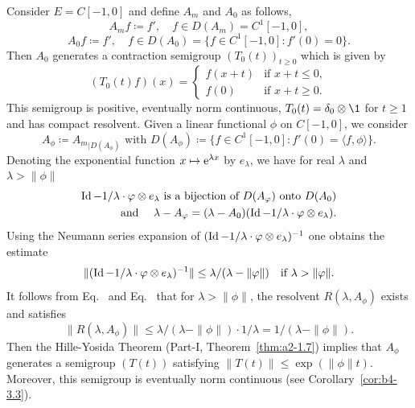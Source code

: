 \begin{example}
\begin{enumerate}[\upshape (i), wide, labelindent=.25em]
	Consider $E = C[-1,0]$ and define $A_{m}$ and $A_{0}$ as follows,
	\begin{equation}\label{eq:b3-2.23}
		A_{m}f \coloneq f', \quad f \in D(A_{m}) = C^{1}[-1,0] , 
	\end{equation}
	\begin{equation}\label{eq:b3-2.24}
		A_{0}f \coloneq f', \quad f \in D(A_{0}) = \{f \in C^{1}[-1,0] \colon f'(0) = 0\}.
	\end{equation}
	Then $A_{0}$ generates a contraction semigroup $(T_{0}(t))_{t \geq 0}$ which is given by
	\begin{equation}\label{eq:b3-2.25}
		(T_{0}(t)f)(x) = \begin{cases}
			f(x+t) & \text{if } x+t \leq 0 ,  \\
			f(0) & \text{if } x+t \geq 0.
		\end{cases}
	\end{equation}
	This semigroup is positive, eventually norm continuous, $T_{0}(t) = \delta_{0}\otimes \1$ for $t \geq 1$ and has compact resolvent.
	Given a linear functional $\phi$ on $C[-1,0]$, we consider
	\begin{equation}\label{eq:b3-2.26}
		A_{\phi} \coloneq {A_{m}}_{|D(A_{\phi})} \text{ with } D(A_{\phi}) \coloneq \{f \in C^{1}[-1,0] \colon f'(0) = \langle f,\phi \rangle\}.
	\end{equation}
	Denoting the exponential function $x \mapsto \mathrm{e}^{\lambda x}$ by $e_{\lambda}$, we have for real $\lambda$ and $\lambda > \|\phi\|$
	 \begin{equation}\label{eq:b3-2.27}
	 \begin{aligned}
		\Id  - 1/\lambda \cdot \phi \otimes e_{\lambda} \text{ is a bijection of } D(A_{\phi}) \text{ onto } D(A_{0})   \\
		\text{ and }\quad \lambda - A_{\phi} = (\lambda - A_{0})(\Id  - 1/\lambda \cdot \phi \otimes e_{\lambda}).
	\end{aligned}
	\end{equation}
	Using the Neumann series expansion of\/ $(\Id  - 1/\lambda \cdot \phi \otimes e_{\lambda})^{-1}$ one obtains the estimate
	\begin{equation}\label{eq:b3-2.28}
		\|(\Id  - 1/\lambda \cdot \phi \otimes e_{\lambda})^{-1}\| \leq \lambda/(\lambda - \|\phi\|) \quad \text{if } \lambda > \|\phi\| .
	\end{equation}
It follows from Eq.~ and Eq.~ that for $\lambda > \|\phi\|$, the resolvent $R(\lambda,A_{\phi})$ exists and satisfies 
\[
\|R(\lambda,A_{\phi})\| \leq \lambda/(\lambda-\|\phi\|)\cdot 1/\lambda = 1/(\lambda-\|\phi\|) .
\]
Then the Hille-Yosida Theorem (Part-I, Theorem~\ref{thm:a2-1.7}) implies that $A_{\phi}$ generates a semigroup $(T(t))$ satisfying $\|T(t)\| \leq \exp(\|\phi\|t)$.
Moreover, this semigroup is eventually norm continuous (see Corollary~\ref{cor:b4-3.3}).


\end{enumerate}
\end{example}
